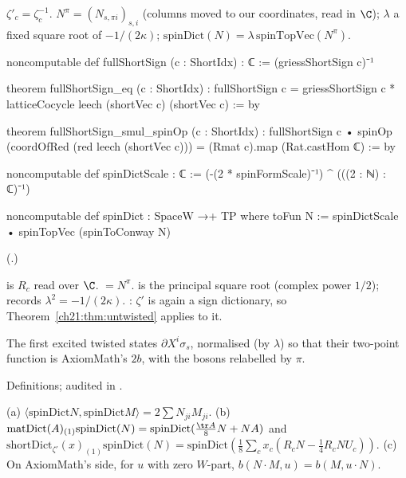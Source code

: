 \begin{definition}\label{ch21:def:spinDict}
$\zeta'_c=\zeta_c^{-1}$.  $N^\pi=(N_{s,\pi i})_{s,i}$ (columns moved to our coordinates, read in $\C$);
$\lambda$ a fixed square root of $-1/(2\kappa)$; $\mathrm{spinDict}(N)=\lambda\,\mathrm{spinTopVec}(N^\pi)$.
\end{definition}
\begin{leancode}
noncomputable def fullShortSign (c : ShortIdx) : ℂ := (griessShortSign c)⁻¹
\end{leancode}
\begin{leancode}
theorem fullShortSign_eq (c : ShortIdx) :
    fullShortSign c = griessShortSign c * latticeCocycle leech (shortVec c) (shortVec c) := by
\end{leancode}
\begin{leancode}
theorem fullShortSign_smul_spinOp (c : ShortIdx) :
    fullShortSign c • spinOp (coordOfRed (red leech (shortVec c))) = (Rmat c).map (Rat.castHom ℂ) := by
\end{leancode}
\begin{leancode}
noncomputable def spinDictScale : ℂ := (-(2 * spinFormScale)⁻¹) ^ (((2 : ℕ) : ℂ)⁻¹)
\end{leancode}
\begin{leancode}
noncomputable def spinDict : SpaceW →+ TP where
  toFun N := spinDictScale • spinTopVec (spinToConway N)
\end{leancode}
(.)
\begin{dictionary}
 is $R_c$ read over $\C$.   $=N^\pi$.
 is the principal square root (complex power $1/2$);  records
$\lambda^2=-1/(2\kappa)$.  : $\zeta'$ is again a sign dictionary, so
Theorem~\ref{ch21:thm:untwisted} applies to it.
\end{dictionary}
\begin{physics}
The first excited twisted states $\partial X^i\sigma_s$, normalised (by $\lambda$) so that their two-point
function is AxiomMath's $2b$, with the bosons relabelled by $\pi$.
\end{physics}
\begin{status}
Definitions; audited in .
\end{status}
\begin{theorem}\label{ch21:thm:spinDict}
(a) $\langle\mathrm{spinDict}N,\mathrm{spinDict}M\rangle=2\sum N_{ji}M_{ji}$.
(b) $\mathrm{matDict}(A)_{(1)}\mathrm{spinDict}(N)=\mathrm{spinDict}(\tfrac{\tr A}8N+NA)$ and
$\mathrm{shortDict}_{\zeta'}(x)_{(1)}\mathrm{spinDict}(N)=\mathrm{spinDict}(\tfrac18\sum_cx_c(R_cN-\tfrac14R_cNU_c))$.
(c) On AxiomMath's side, for $u$ with zero $W$-part, $b(N\cdot M,u)=b(M,u\cdot N)$.
\end{theorem}
